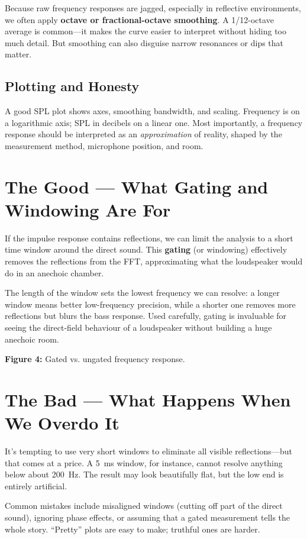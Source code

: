 \documentclass[12pt,a4paper]{article}
\begin{document}
Because raw frequency responses are jagged, especially in reflective environments, we often apply \textbf{octave or fractional-octave smoothing}. A 1/12-octave average is common—it makes the curve easier to interpret without hiding too much detail. But smoothing can also disguise narrow resonances or dips that matter.

\subsection*{Plotting and Honesty}

A good SPL plot shows axes, smoothing bandwidth, and scaling. Frequency is on a logarithmic axis; SPL in decibels on a linear one. Most importantly, a frequency response should be interpreted as an \emph{approximation} of reality, shaped by the measurement method, microphone position, and room.

\section{The Good --- What Gating and Windowing Are For}

If the impulse response contains reflections, we can limit the analysis to a short time window around the direct sound. This \textbf{gating} (or windowing) effectively removes the reflections from the FFT, approximating what the loudspeaker would do in an anechoic chamber.  

The length of the window sets the lowest frequency we can resolve: a longer window means better low-frequency precision, while a shorter one removes more reflections but blurs the bass response. Used carefully, gating is invaluable for seeing the direct-field behaviour of a loudspeaker without building a huge anechoic room.

\vspace{1em}
\noindent\textbf{Figure 4:} Gated vs. ungated frequency response.

\section{The Bad --- What Happens When We Overdo It}

It’s tempting to use very short windows to eliminate all visible reflections—but that comes at a price. A 5~ms window, for instance, cannot resolve anything below about 200~Hz. The result may look beautifully flat, but the low end is entirely artificial.  

Common mistakes include misaligned windows (cutting off part of the direct sound), ignoring phase effects, or assuming that a gated measurement tells the whole story. “Pretty” plots are easy to make; truthful ones are harder.
\end{document}
